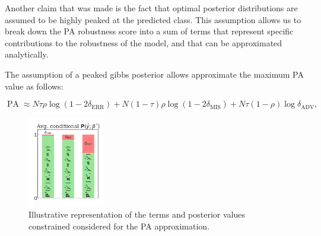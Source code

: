 Another claim that was made is the fact that optimal posterior distributions are
assumed to be highly peaked at the predicted class. This assumption allows us to
break down the PA robustness score into a sum of terms that represent specific
contributions to the robustness of the model, and that can be approximated
analytically.

\begin{theorem}
    The assumption of a peaked gibbs posterior allows approximate the maximum PA value as follows:

    $$
        \operatorname{PA} \approx N\tau \rho \log \left( 1 - 2\delta_{\text{ERR}} \right) + N(1- \tau) \rho \log \left( 1 - 2\delta_{\text{MIS}} \right)  + N\tau (1 - \rho) \log \delta_{\text{ADV}},
    $$
\end{theorem}
\begin{figure}[H]
    \centering
    \includegraphics[width=0.3\textwidth]{img/results_discussion/adversarial/demonstration.png}
    \caption{Illustrative representation of the terms and posterior values constrained
    considered for the PA approximation.
    }
    \label{fig:appendix_adv_illustration}
\end{figure}
